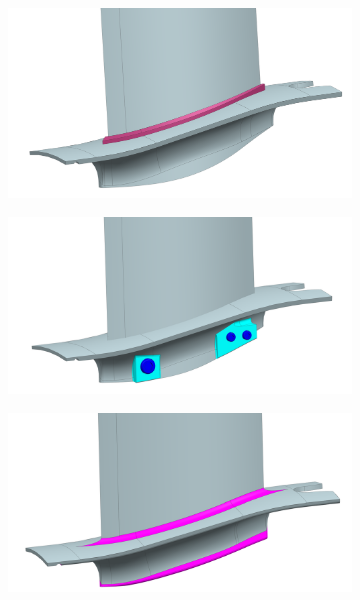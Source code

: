 \documentclass[aerospace,article,submit,moreauthors,pdftex]{Definitions/mdpi}
\begin{document}
\begin{figure}[th!]
    \begin{center}
    \centering
        \begin{subfigure}[b]{0.3\textwidth}
            \centering
            \includegraphics[width=\textwidth]{figures/footGluedGKN.png}
            \caption{}
            \label{fig:footGlued}
        \end{subfigure}
        \hfill
        \begin{subfigure}[b]{0.3\textwidth}
            \centering
            \includegraphics[width=\textwidth]{figures/footBoltedGKN.png}
            \caption{}
            \label{fig:footBolted}
        \end{subfigure}
        \hfill
        \begin{subfigure}[b]{0.3\textwidth}
            \centering
            \includegraphics[width=\textwidth]{figures/footOnePiceGKN.png}

\end{subfigure}
\end{center}
\end{figure}
\end{document}
